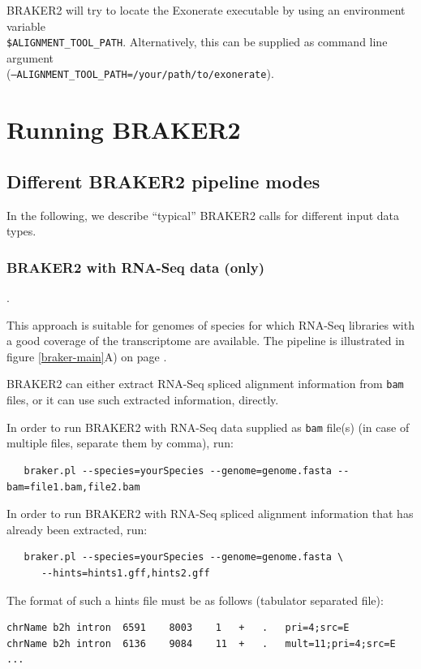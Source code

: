 \documentclass[a4paper,10pt]{report}
\begin{document}
BRAKER2 will try to locate the Exonerate executable by using an environment variable \\\texttt{\$ALIGNMENT\_TOOL\_PATH}. Alternatively, this can be supplied as command line argument \\(\texttt{--ALIGNMENT\_TOOL\_PATH=/your/path/to/exonerate}).

\chapter{Running BRAKER2}

\section{Different BRAKER2 pipeline modes}

In the following, we describe ``typical'' BRAKER2 calls for different input data types.

\subsection{BRAKER2 with RNA-Seq data (only)}\label{braker1}.

This approach is suitable for genomes of species for which RNA-Seq libraries with a good coverage of the transcriptome are available. The pipeline is illustrated in figure \ref{braker-main}A) on page \pageref{braker-main}.

BRAKER2 can either extract RNA-Seq spliced alignment information from \texttt{bam} files, or it can use such extracted information, directly.

In order to run BRAKER2 with RNA-Seq data supplied as \texttt{bam} file(s) (in case of multiple files, separate them by comma), run:

\begin{verbatim}
   braker.pl --species=yourSpecies --genome=genome.fasta --bam=file1.bam,file2.bam
\end{verbatim}

In order to run BRAKER2 with RNA-Seq spliced alignment information that has already been extracted, run:

\begin{verbatim}
   braker.pl --species=yourSpecies --genome=genome.fasta \
      --hints=hints1.gff,hints2.gff
\end{verbatim}

The format of such a hints file must be as follows (tabulator separated file):

\begin{verbatim}
chrName	b2h	intron	6591	8003	1	+	.	pri=4;src=E
chrName	b2h	intron	6136	9084	11	+	.	mult=11;pri=4;src=E
...
\end{verbatim}
\end{document}
